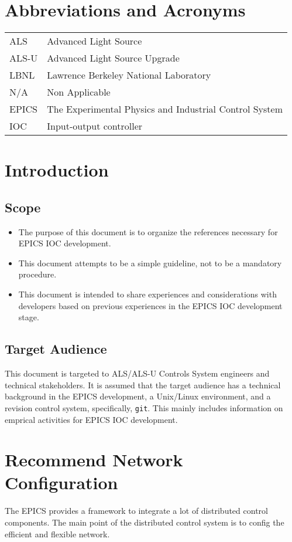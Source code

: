 \documentclass[11pt
  , letterpaper
  , article
  , oneside
  , showtrims
]{memoir}
\begin{document}
\chapter{Abbreviations and Acronyms}
\begin{table}[!h]
  \centering
  \begin{tabularx}{\textwidth}{ll}
    ALS   & Advanced Light Source \\
    ALS-U & Advanced Light Source Upgrade \\
    LBNL  & Lawrence Berkeley National Laboratory \\
    N/A   & Non Applicable \\
    EPICS & The Experimental Physics and Industrial Control System \\
    IOC   & Input-output controller
  \end{tabularx}
\end{table}
\chapter{Introduction}

\section{Scope}
\begin{itemize}
\item The purpose of this document is to organize the references necessary for EPICS IOC development.
\item This document attempts to be a simple guideline, not to be a mandatory procedure.
\item This document is intended to share experiences and considerations with developers based on previous experiences in the EPICS IOC development stage.
\end{itemize}

\section{Target Audience}
This document is targeted to ALS/ALS-U Controls System engineers and technical stakeholders. It is assumed that the target audience has a technical background in the EPICS development, a Unix/Linux environment, and a revision control system, specifically, \texttt{git}. This mainly includes information on emprical activities for EPICS IOC development.

\chapter{Recommend Network Configuration}
The EPICS provides a framework to integrate a lot of distributed control components. The main point of the distributed control system is to config the efficient and flexible network. 
\end{document}

